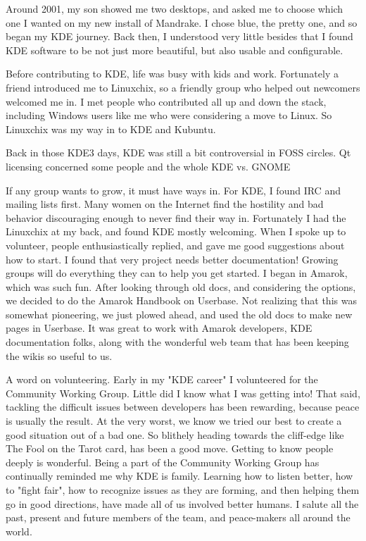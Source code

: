 

\noindent{}Around 2001, my son showed me two desktops, and asked me to choose which one I wanted on my new install of Mandrake. I chose blue, the pretty one, and so began my KDE journey. Back then, I understood very little besides that I found KDE software to be not just more beautiful, but also usable and configurable. 

Before contributing to KDE, life was busy with kids and work. Fortunately a friend introduced me to Linuxchix, so a friendly group who helped out newcomers welcomed me in. I met people who contributed all up and down the stack, including Windows users like me who were considering a move to Linux. So Linuxchix was my way in to KDE and Kubuntu.

Back in those KDE3 days, KDE was still a bit controversial in FOSS circles. Qt licensing concerned some people and the whole KDE vs. GNOME 

If any group wants to grow, it must have ways in. For KDE, I found IRC and mailing lists first. Many women on the Internet find the hostility and bad behavior discouraging enough to never find their way in. Fortunately I had the Linuxchix at my back, and found KDE mostly welcoming. When I spoke up to volunteer, people enthusiastically replied, and gave me good suggestions about how to start. I found that very project needs better documentation! Growing groups will do everything they can to help you get started. I began in Amarok, which was such fun. After looking through old docs, and considering the options, we decided to do the Amarok Handbook on Userbase. Not realizing that this was somewhat pioneering, we just plowed ahead, and used the old docs to make new pages in Userbase. It was great to work with Amarok developers, KDE documentation folks, along with the wonderful web team that has been keeping the wikis so useful to us. 

A word on volunteering. Early in my "KDE career" I volunteered for the Community Working Group. Little did I know what I was getting into! That said, tackling the difficult issues between developers has been rewarding, because peace is usually the result. At the very worst, we know we tried our best to create a good situation out of a bad one. So blithely heading towards the cliff-edge like The Fool on the Tarot card, has been a good move. Getting to know people deeply is wonderful. Being a part of the Community Working Group has continually reminded me why KDE is family. Learning how to listen better, how to "fight fair", how to recognize issues as they are forming, and then helping them go in good directions, have made all of us involved better humans. I salute all the past, present and future members of the team, and peace-makers all around the world.

